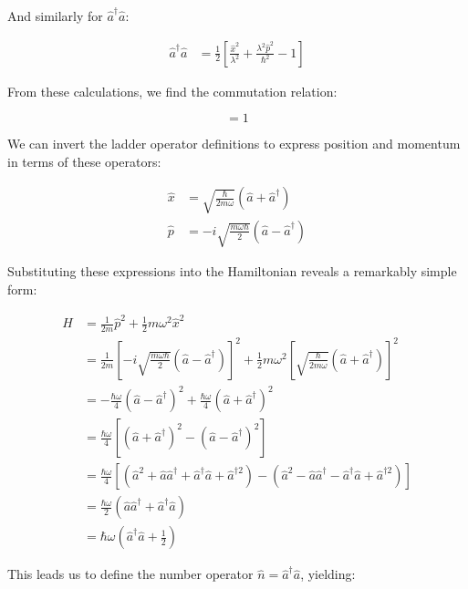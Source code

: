 \documentclass[italian]{HKNdocument}
\begin{document}
And similarly for $\hat{a}^\dagger\hat{a}$:

\begin{align}
\hat{a}^\dagger\hat{a} &= \frac{1}{2}\left[\frac{\hat{x}^2}{\lambda^2} + \frac{\lambda^2\hat{p}^2}{\hbar^2} - 1\right] \label{eq:5.9}
\end{align}

From these calculations, we find the commutation relation:

\begin{equation}
[a,a^\dagger] = 1 \label{eq:5.10}
\end{equation}

We can invert the ladder operator definitions to express position and momentum in terms of these operators:

\begin{align}
\hat{x} &= \sqrt{\frac{\hbar}{2m\omega}}(\hat{a} + \hat{a}^\dagger) \\
\hat{p} &= -i\sqrt{\frac{m\omega\hbar}{2}}(\hat{a} - \hat{a}^\dagger) \label{eq:5.11}
\end{align}

Substituting these expressions into the Hamiltonian reveals a remarkably simple form:

\begin{align}
\hat{H} &= \frac{1}{2m}\hat{p}^2 + \frac{1}{2}m\omega^2\hat{x}^2 \\
&= \frac{1}{2m}\left[-i\sqrt{\frac{m\omega\hbar}{2}}(\hat{a} - \hat{a}^\dagger)\right]^2 + \frac{1}{2}m\omega^2\left[\sqrt{\frac{\hbar}{2m\omega}}(\hat{a} + \hat{a}^\dagger)\right]^2 \\
&= -\frac{\hbar\omega}{4}(\hat{a} - \hat{a}^\dagger)^2 + \frac{\hbar\omega}{4}(\hat{a} + \hat{a}^\dagger)^2 \\
&= \frac{\hbar\omega}{4}[(\hat{a} + \hat{a}^\dagger)^2 - (\hat{a} - \hat{a}^\dagger)^2] \label{eq:5.12} \\
&= \frac{\hbar\omega}{4}[(\hat{a}^2 + \hat{a}\hat{a}^\dagger + \hat{a}^\dagger\hat{a} + \hat{a}^{\dagger2}) - (\hat{a}^2 - \hat{a}\hat{a}^\dagger - \hat{a}^\dagger\hat{a} + \hat{a}^{\dagger2})] \\
&= \frac{\hbar\omega}{2}(\hat{a}\hat{a}^\dagger + \hat{a}^\dagger\hat{a}) \\
&= \hbar\omega\left(\hat{a}^\dagger\hat{a} + \frac{1}{2}\right)
\end{align}

This leads us to define the number operator $\hat{n} = \hat{a}^\dagger\hat{a}$, yielding:
\end{document}
